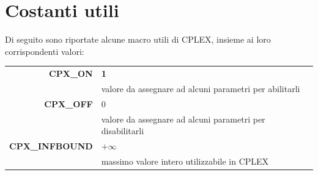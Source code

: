 \section{Costanti utili}
Di seguito sono riportate alcune macro utili di CPLEX, insieme ai loro corrispondenti valori:
\begin{table}[h]
\footnotesize\centering
\begin{tabular}{|r|l|}
\hline
\textbf{CPX\_ON} & {\textbf{1}}\\
{} & {valore da assegnare ad alcuni parametri per abilitarli}\\
\hline
\textbf{CPX\_OFF} & {0}\\
{} & {valore da assegnare ad alcuni parametri per disabilitarli}\\
\hline
\textbf{CPX\_INFBOUND} & {$+\infty$}\\
{} & {massimo valore intero utilizzabile in CPLEX}\\
\hline
\end{tabular}
\end{table}
